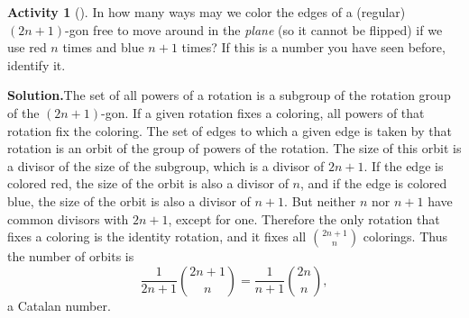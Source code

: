 \documentclass[10pt,]{book}
\theoremstyle{plain}
\theoremstyle{definition}
\newtheorem{activity}[project]{Activity}
\numberwithin{equation}{chapter}
\begin{document}
\begin{activity}[]\label{Catalancircle}
In how many ways may we color the edges of a (regular) \((2n+1)\)-gon free to move around in the \emph{plane} (so it cannot be flipped) if we use red \(n\) times and blue \(n+1\) times? If this is a number you have seen before, identify it. %
\par\medskip\noindent%
\textbf{Solution.}\quad The set of all powers of a rotation is a subgroup of the rotation group of the \((2n+1)\)-gon. If a given rotation fixes a coloring, all powers of that rotation fix the coloring. The set of edges to which a given edge is taken by that rotation is an orbit of the group of powers of the rotation. The size of this orbit is a divisor of the size of the subgroup, which is a divisor of \(2n+1\). If the edge is colored red, the size of the orbit is also a divisor of \(n\), and if the edge is colored blue, the size of the orbit is also a divisor of \(n+1\). But neither \(n\) nor \(n+1\) have common divisors with \(2n+1\), except for one. Therefore the only rotation that fixes a coloring is the identity rotation, and it fixes all \(\binom{2n+1}{n}\) colorings. Thus the number of orbits is%
\begin{equation*}
\frac{1}{2n+1}\binom{2n+1}{n} = \frac{1}{n+1}\binom{2n}{n},
\end{equation*}
a Catalan number.%
\end{activity}
\end{document}
